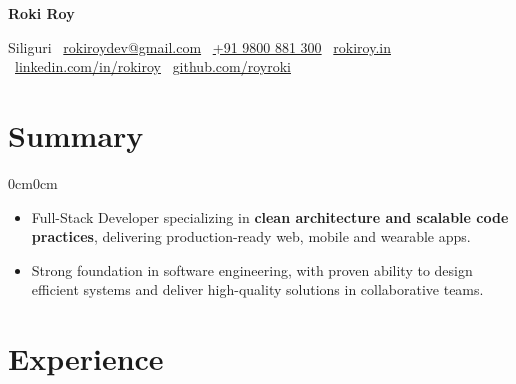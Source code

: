 \documentclass[10pt, letterpaper]{article}
\newenvironment{highlights}{
    \begin{itemize}[topsep=0pt, parsep=0.3pt, itemsep=0pt, leftmargin=10pt]
}{
    \end{itemize}
}
\newenvironment{onecolentry}{\begin{adjustwidth}{0cm}{0cm}}{\end{adjustwidth}}
\newenvironment{header}{
    \setlength{\topsep}{0pt}\par\kern\topsep\centering\linespread{1.3}
}{\par\kern\topsep}
\begin{document}
\begin{header}
    \fontsize{24pt}{24pt}\selectfont \textbf{Roki Roy}

    \vspace{4pt}

    \normalsize
    Siliguri \textbar\ 
    \href{mailto:rokiroydev@gmail.com}{rokiroydev@gmail.com} \textbar\ 
    \href{tel:+91-980-088-13-00}{+91 9800 881 300} \textbar\ 
    \href{https://rokiroy.in}{rokiroy.in} \textbar\ 
    \href{https://linkedin.com/in/rokiroy}{linkedin.com/in/rokiroy} \textbar\ 
    \href{https://github.com/royroki}{github.com/royroki}
\end{header}

\vspace{-0.3cm}
\section{Summary}
\begin{onecolentry}
    \begin{highlights}
        \item Full-Stack Developer specializing in \textbf{clean architecture and scalable code practices}, delivering production-ready web, mobile and wearable apps.
        \item Strong foundation in software engineering, with proven ability to design efficient systems and deliver high-quality solutions in collaborative teams.
    \end{highlights}
\end{onecolentry}


\vspace{-0.1cm}
\section{Experience}
\end{document}
